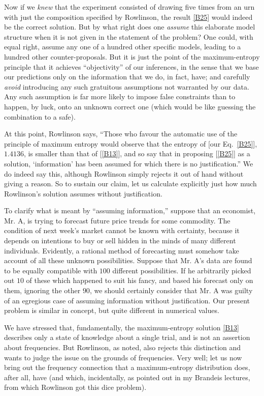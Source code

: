 Now if we \emph{knew} that the experiment consisted of drawing five times from an urn with just the composition specified by Rowlinson, the result \eqref{B25} would indeed be the correct solution.
But by what right does one \emph{assume} this elaborate model structure when it is not given in the statement of the problem?
One could, with equal right, assume any one of a hundred other specific models, leading to a hundred other counter-proposals.
But it is just the point of the maximum-entropy principle that it achieves ``objectivity'' of our inferences, in the sense that we base our predictions only on the information that we do, in fact, have; and carefully \emph{avoid} introducing any such gratuitous assumptions not warranted by our data.
Any such assumption is far more likely to impose false constraints than to happen, by luck, onto an unknown correct one (which would be like guessing the combination to a safe).

At this point, Rowlinson says, ``Those who favour the automatic use of the principle of maximum entropy would observe that the entropy of [our Eq.~\eqref{B25}], $1.4136$, is smaller than that of [\ref{B13}], and so say that in proposing [\ref{B25}] as a solution, `information' has been assumed for which there is no justification.''
We do indeed say this, although Rowlinson simply rejects it out of hand without giving a reason.
So to sustain our claim, let us calculate explicitly just how much Rowlinson's solution assumes without justification.

To clarify what is meant by ``assuming information,'' suppose that an economist, Mr. A, is trying to forecast future price trends for some commodity.
The condition of next week's market cannot be known with certainty, because it depends on intentions to buy or sell hidden in the minds of many different individuals.
Evidently, a rational method of forecasting must somehow take account of all these unknown possibilities.
Suppose that Mr. A's data are found to be equally compatible with $100$ different possibilities.
If he arbitrarily picked out $10$ of these which happened to suit his fancy, and based his forecast only on them, ignoring the other $90$, we should certainly consider that Mr. A was guilty of an egregious case of assuming information without justification.
Our present problem is similar in concept, but quite different in numerical values.

We have stressed that, fundamentally, the maximum-entropy solution \eqref{B13} describes only a state of knowledge about a single trial, and is not an assertion about frequencies.
But Rowlinson, as noted, also rejects this distinction and wants to judge the issue on the grounds of frequencies.
Very well; let us now bring out the frequency connection that a maximum-entropy distribution does, after all, have (and which, incidentally, as pointed out in my Brandeis lectures, from which Rowlinson got this dice problem).

